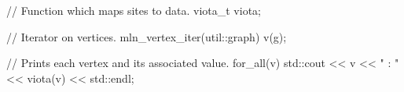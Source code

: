// Function which maps sites to data.
viota_t viota;

// Iterator on vertices.
mln_vertex_iter(util::graph) v(g);

// Prints each vertex and its associated value.
for_all(v)
{
  std::cout << v << " : " << viota(v) << std::endl;
}

